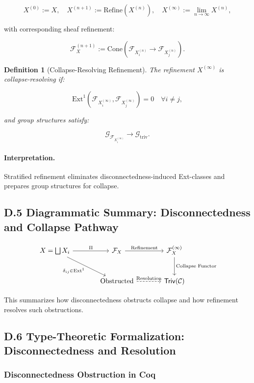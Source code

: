 \documentclass[11pt]{article}
\newtheorem{definition}[theorem]{Definition}
\begin{document}
\[
X^{(0)} := X, \quad X^{(n+1)} := \mathrm{Refine}(X^{(n)}), \quad X^{(\infty)} := \lim_{n \to \infty} X^{(n)},
\]

with corresponding sheaf refinement:

\[
\mathcal{F}_X^{(n+1)} := \mathrm{Cone}(\mathcal{F}_{X^{(n)}_i} \to \mathcal{F}_{X^{(n)}_j}).
\]

\begin{definition}[Collapse-Resolving Refinement]
The refinement \( X^{(\infty)} \) is \emph{collapse-resolving} if:

\[
\mathrm{Ext}^1(\mathcal{F}_{X^{(\infty)}_i}, \mathcal{F}_{X^{(\infty)}_j}) = 0 \quad \forall i \neq j,
\]

and group structures satisfy:

\[
\mathcal{G}_{\mathcal{F}_{X^{(\infty)}_i}} \longrightarrow \mathcal{G}_{\mathrm{triv}}.
\]
\end{definition}

\paragraph{Interpretation.}
Stratified refinement eliminates disconnectedness-induced Ext-classes and prepares group structures for collapse.

\subsection*{D.5 Diagrammatic Summary: Disconnectedness and Collapse Pathway}

\[
\begin{tikzcd}[column sep=large, row sep=large]
X = \bigsqcup X_i \arrow[r, "\Pi"] \arrow[dr, "\delta_{ij} \in \mathrm{Ext}^1"']
& \mathcal{F}_X \arrow[r, "\mathrm{Refinement}"]
& \mathcal{F}_X^{(\infty)} \arrow[d, "\text{Collapse Functor}"] \\
& \text{Obstructed} \arrow[r, dashed, "\text{Resolution}"]
& \mathsf{Triv}(\mathcal{C})
\end{tikzcd}
\]

This summarizes how disconnectedness obstructs collapse and how refinement resolves such obstructions.

\subsection*{D.6 Type-Theoretic Formalization: Disconnectedness and Resolution}

\subsubsection*{Disconnectedness Obstruction in Coq}
\end{document}
